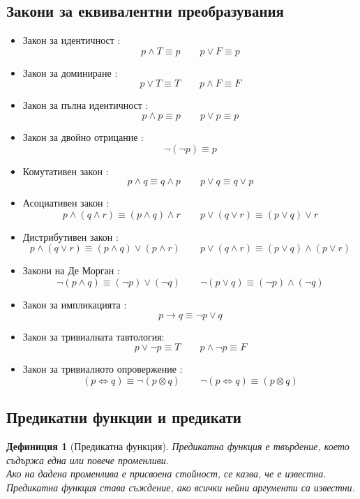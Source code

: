 \documentclass[fleqn, 12pt]{article}
\newtheorem{definition}{Дефиниция}[subsection]
\theoremstyle{definition}
\begin{document}
\newpage

\subsection{Закони за еквивалентни преобразувания}

\begin{itemize}
	\item Закон за идентичност : $$p \land T \equiv p \qquad p \lor F \equiv p$$
	\item Закон за доминиране : $$p \lor T \equiv T \qquad p \land F \equiv F$$
	\item Закон за пълна идентичност : $$p \land p \equiv p \qquad p \lor p \equiv p$$
	\item Закон за двойно отрицание : $$\neg(\neg p) \equiv p $$
	\item Комутативен закон : $$p \land q \equiv q \land p \qquad p \lor q \equiv q \lor p$$
	\item Асоциативен закон : $$p \land (q \land r) \equiv (p \land q ) \land r \qquad p \lor (q \lor r) \equiv (p \lor q ) \lor r$$
	\item Дистрибутивен закон : $$p \land (q \lor r) \equiv (p \land q ) \lor (p \land r ) \qquad p \lor (q \land r) \equiv (p \lor q ) \land (p \lor r )  $$
	\item Закони на Де Морган : $$\neg (p \land q) \equiv (\neg p) \lor (\neg q) \qquad \neg (p \lor q) \equiv (\neg p) \land (\neg q) $$
	\item Закон за импликацията : $$p \to q \equiv \neg p \lor q$$
	\item Закон за тривиалната тавтология:  $$p \lor \neg p \equiv T \qquad p \land \neg p \equiv F$$
	\item Закон за тривиалното опровержение : $$(p \Leftrightarrow q) \equiv \neg (p \otimes q) \qquad \neg (p \Leftrightarrow q) \equiv (p \otimes q) $$
\end{itemize}

\subsection{Предикатни функции и предикати}

\begin{definition}[Предикатна функция]
Предикатна функция е твърдение, което съдържа една или повече променливи. \\
Ако на дадена променлива е присвоена стойност, се казва, че е известна.\\
Предикатна функция става съждение, ако всички нейни аргументи са известни. \\
\end{definition}
\end{document}
